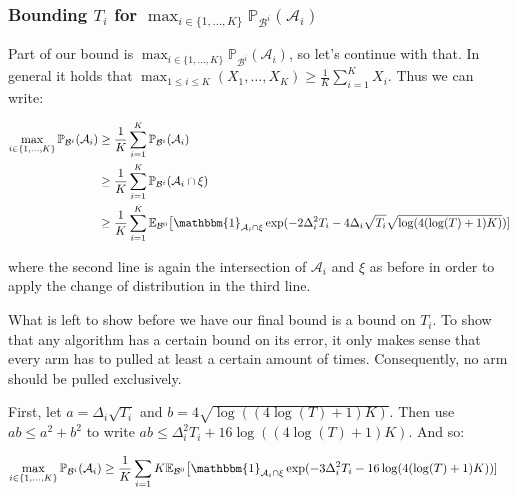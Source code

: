 \documentclass[12pt,]{article}
\begin{document}
\subsubsection{\texorpdfstring{Bounding \(T_i\) for
\(\max_{i \in \{1,\dots,K\}}\mathbb{P}_{\mathcal{B}^i}(\mathcal{A}_i)\)}{Bounding T\_i for \textbackslash{}max\_\{i \textbackslash{}in \textbackslash{}\{1,\textbackslash{}dots,K\textbackslash{}\}\}\textbackslash{}mathbb\{P\}\_\{\textbackslash{}mathcal\{B\}\^{}i\}(\textbackslash{}mathcal\{A\}\_i)}}\label{bounding-t_i-for-max_i-in-1dotskmathbbp_mathcalbimathcala_i}

Part of our bound is
\(\max_{i \in \{1,\dots,K\}} \mathbb{P}_{\mathcal{B}^i}(\mathcal{A}_i)\),
so let's continue with that. In general it holds that
\(\max_{1 \leq i \leq K} (X_1, \dots, X_K) \geq \frac{1}{K}\sum_{i=1}^K X_i\).
Thus we can write:

\begin{align*}
\max_{i \in \{1,\dots,K\}} \mathbb{P}_{\mathcal{B}^i}(\mathcal{A}_i) & \geq \frac{1}{K} \sum_{i=1}^{K} \mathbb{P}_{\mathcal{B}^i}(\mathcal{A}_i) \\
& \geq \frac{1}{K} \sum_{i=1}^{K} \mathbb{P}_{\mathcal{B}^i}(\mathcal{A}_i \cap \xi) \\
& \geq \frac{1}{K} \sum_{i=1}^{K} \mathbb{E}_{\mathcal{B}^0} \big[\mathbbm{1}_{\mathcal{A}_i \cap \xi} \exp (- 2 \Delta_i^2 T_i - 4 \Delta_i \sqrt{T_i} \sqrt{\log(4(\log(T)+1)K)}) ]
\end{align*}

where the second line is again the intersection of \(\mathcal{A}_i\) and
\(\xi\) as before in order to apply the change of distribution in the
third line.

What is left to show before we have our final bound is a bound on
\(T_i\). To show that any algorithm has a certain bound on its error, it
only makes sense that every arm has to pulled at least a certain amount
of times. Consequently, no arm should be pulled exclusively.

First, let \(a = \Delta_i \sqrt{T_i}\) and
\(b = 4\sqrt{\log((4\log(T)+1)K)}\). Then use \(ab \leq a^2 + b^2\) to
write \(ab \leq \Delta_i^2 T_i + 16\log((4\log(T)+1)K)\). And so:

\begin{align*}
\max_{i \in \{1,\dots,K\}} \mathbb{P}_{\mathcal{B}^i}(\mathcal{A}_i) & \geq \frac{1}{K} \sum_{i=1}{K} \mathbb{E}_{\mathcal{B}^0} \big[\mathbbm{1}_{\mathcal{A}_i \cap \xi} \exp (- 3 \Delta_i^2 T_i - 16 \log(4(\log(T)+1)K)) ]
\end{align*}
\end{document}
